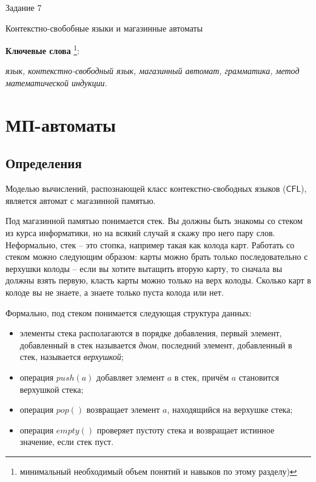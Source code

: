 \documentclass[12pt]{article}
\theoremstyle{definiton}
\theoremstyle{definition}
\theoremstyle{definition}
\def\CFL{{\mathsf{CFL}}}
\begin{document}
\centerline{\LARGE Задание 7}

\medskip

\begin{center}
	{\Large Контекстно-свобобные языки и магазинные автоматы}
\end{center}

\bigskip



{\bf Ключевые слова }\footnote{минимальный необходимый объем понятий и навыков по
этому разделу)}:{\em  язык, контекстно-свободный язык, магазинный автомат, грамматика, метод математической индукции. %

}

\section{МП-автоматы }

\subsection{Определения}

Моделью вычислений, распознающей класс контекстно-свободных языков ($\CFL$), является автомат с магазинной памятью.

Под магазинной памятью понимается стек. Вы должны быть знакомы со стеком из курса информатики, но на всякий случай я скажу про него пару слов. Неформально, стек -- это стопка, например такая как колода карт. Работать со стеком можно следующим образом: карты можно брать только последовательно с верхушки колоды -- если вы хотите вытащить вторую карту, то сначала вы должны взять первую, класть карты можно только на верх колоды. Сколько карт в колоде вы не знаете, а знаете только пуста колода или нет. 

Формально,  под стеком понимается следующая структура данных:
\begin{itemize}
	\item  элементы стека располагаются в порядке добавления, первый элемент, добавленный в стек называется \emph{дном}, последний элемент, добавленный в стек, называется \emph{верхушкой};
	\item  операция $push(a)$ добавляет элемент $a$ в стек, причём $a$ становится верхушкой стека;
	\item  операция $pop()$ возвращает элемент $a$, находящийся на верхушке стека;
	\item операция $empty()$ проверяет пустоту стека и возвращает истинное значение, если стек пуст.
\end{itemize}
\end{document}
